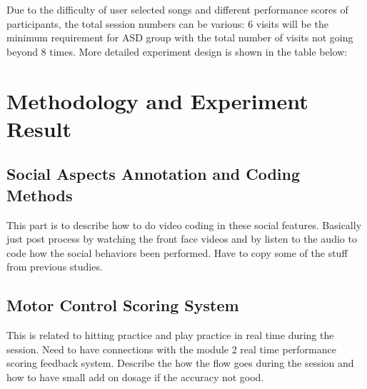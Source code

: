 Due to the difficulty of user selected songs and different performance scores of
participants, the total session numbers can be various: 6 visits will be the minimum
requirement for ASD group with the total number of visits not going beyond 8 times. More detailed 
experiment design is shown in the table below:\\


\section{Methodology and Experiment Result}

\subsection{Social Aspects Annotation and Coding Methods}
This part is to describe how to do video coding in these social features.
Basically just post process by watching the front face videos and by listen to the
audio to code how the social behaviors been performed. Have to copy some of the stuff
from previous studies.

\subsection{Motor Control Scoring System}
This is related to hitting practice and play practice in real time during the session.
Need to have connections with the module 2 real time performance scoring feedback system.
Describe the how the flow goes during the session and how to have small add on dosage
if the accuracy not good. \\

